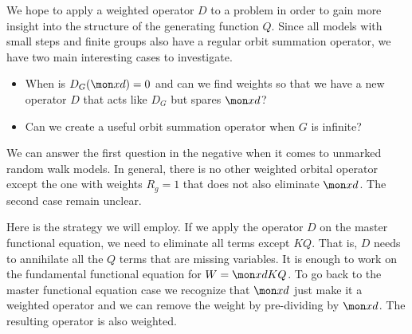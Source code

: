 We hope to apply a weighted operator $D$ to a problem in order to gain more insight into the structure of the generating function $Q$. Since all models with small steps and finite groups also have a regular orbit summation operator, we have two main interesting cases to investigate.
\begin{itemize}
\item[(1)] When is $D_G(\mon xd) = 0$ and can we find weights so that we have a new operator $D$ that acts like $D_G$ but spares $\mon xd$?
\item[(2)] Can we create a useful orbit summation operator when $G$ is infinite?
\end{itemize}
We can answer the first question in the negative when it comes to unmarked random walk models. In general, there is no other weighted orbital operator except the one with weights $R_g = 1$ that does not also eliminate $\mon xd$. The second case remain unclear.

Here is the strategy we will employ. If we apply the operator $D$ on the master functional equation, we need to eliminate all terms except $KQ$. That is, $D$ needs to annihilate all the $Q$ terms that are missing variables. It is enough to work on the fundamental functional equation for $W = \mon xd KQ$. To go back to the master functional equation case we recognize that $\mon xd$ just make it a weighted operator and we can remove the weight by pre-dividing by $\mon xd$. The resulting operator is also weighted.

